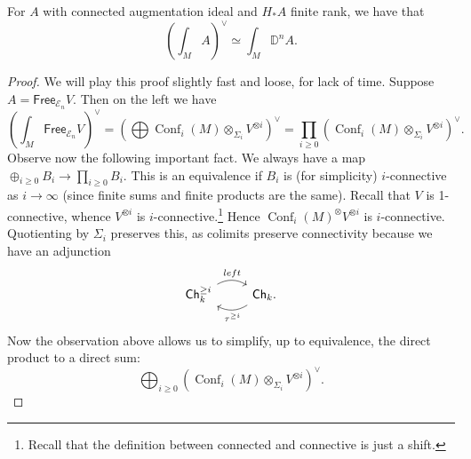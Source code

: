 \documentclass{amsart}
\DeclareMathOperator{\Conf}{Conf}
\begin{document}
\begin{proposition}
    For $A$ with connected augmentation ideal and $H_*A$ finite rank, we have that
    \begin{equation*}
        \left( \int_M A \right)^\vee \simeq \int_M\mathbb{D}^n A.
    \end{equation*}
\end{proposition}
\begin{proof}
    We will play this proof slightly fast and loose, for lack of time.
    Suppose $A=\mathsf{Free}_{\mathcal{E}_n}V$. Then on the left we have
    \begin{equation*}
        \left( \int_M\mathsf{Free}_{\mathcal{E}_n}V \right)^\vee = \left(\bigoplus \Conf_i(M)\otimes_{\Sigma_i}V^{\otimes i} \right)^\vee
        = \prod_{i\geq 0}\left( \Conf_i(M)\otimes_{\Sigma_i}V^{\otimes i} \right)^\vee.
    \end{equation*}
    Observe now the following important fact. We always have a map $\oplus_{i\geq 0}B_i\to\prod_{i\geq 0}B_i$.
    This is an equivalence if $B_i$ is (for simplicity) $i$-connective as $i\to\infty$ (since
    finite sums and finite products are the same).
    Recall that $V$ is 1-connective, whence $V^{\otimes i}$ is $i$-connective.\footnote{Recall
    that the definition between connected and connective is just a shift.} Hence
    $\Conf_i(M)^\otimes V^{\otimes i}$ is $i$-connective. Quotienting by $\Sigma_i$ preserves
    this, as colimits preserve connectivity because we have an adjunction
    \begin{equation*}
        \begin{tikzcd}
            \mathsf{Ch}_k^{\geq i} \rar[bend left]{left} & \mathsf{Ch}_k \lar[bend left]{\tau^{\geq i}}.
        \end{tikzcd}
    \end{equation*}
    Now the observation above allows us to simplify, up to equivalence, the direct product to a direct sum:
    \begin{equation*}
        \bigoplus_{i\geq 0}\left(\Conf_i(M)\otimes_{\Sigma_i}V^{\otimes i}\right)^\vee.
    \end{equation*}


\end{proof}
\end{document}
